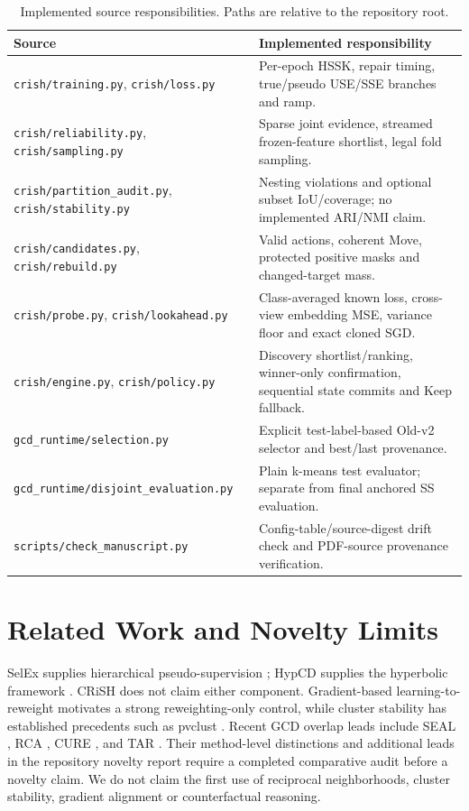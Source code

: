 \documentclass[conference]{IEEEtran}
\newcommand{\code}[1]{\texttt{#1}}
\begin{document}
\begin{table}[!t]\footnotesize\centering
\caption{Implemented source responsibilities. Paths are relative to the repository root.}
\begin{tabularx}{\textwidth}{@{}p{5.2cm}X@{}}\toprule
Source & Implemented responsibility\\\midrule
\code{crish/training.py}, \code{crish/loss.py} & Per-epoch HSSK, repair timing, true/pseudo USE/SSE branches and ramp.\\
\code{crish/reliability.py}, \code{crish/sampling.py} & Sparse joint evidence, streamed frozen-feature shortlist, legal fold sampling.\\
\code{crish/partition\_audit.py}, \code{crish/stability.py} & Nesting violations and optional subset IoU/coverage; no implemented ARI/NMI claim.\\
\code{crish/candidates.py}, \code{crish/rebuild.py} & Valid actions, coherent Move, protected positive masks and changed-target mass.\\
\code{crish/probe.py}, \code{crish/lookahead.py} & Class-averaged known loss, cross-view embedding MSE, variance floor and exact cloned SGD.\\
\code{crish/engine.py}, \code{crish/policy.py} & Discovery shortlist/ranking, winner-only confirmation, sequential state commits and Keep fallback.\\
\code{gcd\_runtime/selection.py} & Explicit test-label-based Old-v2 selector and best/last provenance.\\
\code{gcd\_runtime/disjoint\_evaluation.py} & Plain k-means test evaluator; separate from final anchored SS evaluation.\\
\code{scripts/check\_manuscript.py} & Config-table/source-digest drift check and PDF-source provenance verification.\\\bottomrule
\end{tabularx}\label{tab:implementation_map}
\end{table}

\section{Related Work and Novelty Limits}
SelEx supplies hierarchical pseudo-supervision \cite{selex}; HypCD supplies the hyperbolic framework \cite{hypcd}. CRiSH does not claim either component. Gradient-based learning-to-reweight \cite{ren} motivates a strong reweighting-only control, while cluster stability has established precedents such as pvclust \cite{pvclust}. Recent GCD overlap leads include SEAL \cite{seal}, RCA \cite{rca}, CURE \cite{cure}, and TAR \cite{tar}. Their method-level distinctions and additional leads in the repository novelty report require a completed comparative audit before a novelty claim. We do not claim the first use of reciprocal neighborhoods, cluster stability, gradient alignment or counterfactual reasoning.
\end{document}
